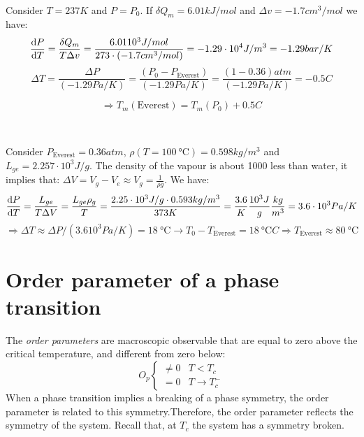 \documentclass[../main/main.tex]{subfiles}
\begin{document}
\begin{example} \

Consider \( T = 237 K \) and \( P=P_0 \). If \( \delta Q_m = 6.01 kJ/mol \) and \( \Delta v = -1.7 cm^3 /mol  \) we have:
\begin{equation}
  \dv{P}{T}  = \frac{\delta Q_m}{T \Delta v} = \frac{6.01 10^3 J/mol}{273 \cdot (-1.7 cm^3/mol)} = -1.29 \cdot 10^4 J/m^3 = -1.29 bar/K
  \label{eq:}
\end{equation}
\begin{equation}
  \Delta T = \frac{\Delta P}{(-1.29 Pa/K)} = \frac{(P_0 - P_{\text{Everest}})}{(-1.29 Pa/K)} = \frac{(1-0.36)atm}{(-1.29 Pa/K)} = -0.5 C
  \label{eq:}
\end{equation}
\end{example}
\begin{equation}
  \Rightarrow T_m ( \text{Everest}) = T_m (P_0) + 0.5 C
  \label{eq:}
\end{equation}
\begin{example} \

Consider \( P_{\text{Everest}}= 0.36 atm \), \( \rho (T= 100\SI{}{\celsius})=0.598 kg/m^3 \) and \( L_{ge} = 2.257 \cdot 10^3 J/g \). The density of the vapour is about 1000 less than water, it implies that: \( \Delta V = V_g - V_e \approx V_g = \frac{1}{\rho g}\). We have:
\begin{equation}
  \dv{P}{T} = \frac{L_{ge}}{T \Delta V} = \frac{L_{ge} \rho _g}{T} = \frac{2.25 \cdot 10^3 J/g \cdot 0.593 kg/m^3}{373 K} = \frac{3.6}{K} \frac{10^3 J}{g} \frac{kg}{m^3} = 3.6 \cdot 10^3 Pa/K
  \label{eq:}
\end{equation}
\begin{equation}
  \Rightarrow \Delta T \approx \Delta P/(3.6 10^3 Pa/K) = 18 \SI{}{\celsius}   \rightarrow T_0 - T_{\text{Everest}} = 18\SI{}{\celsius} C \Rightarrow T_{\text{Everest}}\approx 80\SI{}{\celsius}
  \label{eq:}
\end{equation}
\end{example}

\section{Order parameter of a phase transition}
The \emph{order parameters} are macroscopic observable that are equal to zero above the critical temperature, and different from zero below:
\begin{equation}
O_p
  \begin{cases}
  \neq 0 & T<T_c \\
  = 0 & T \rightarrow T_c^-
  \end{cases}
\label{eq:}
\end{equation}
When a phase transition implies a breaking of a phase symmetry, the order parameter is related to this symmetry.Therefore, the order parameter reflects the symmetry of the system. Recall that, at \( T_c \) the system has a symmetry broken.
\end{document}
